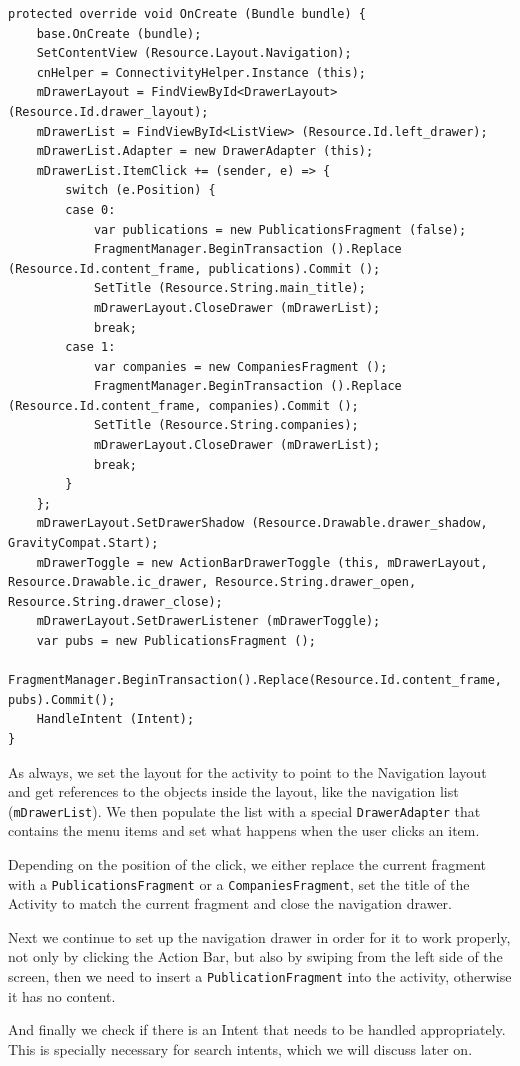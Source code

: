 \begin{lstlisting}[frame=lt,caption=MainActivity.cs, label={list:main_ac2}]
protected override void OnCreate (Bundle bundle) {
	base.OnCreate (bundle);
	SetContentView (Resource.Layout.Navigation);
	cnHelper = ConnectivityHelper.Instance (this);
	mDrawerLayout = FindViewById<DrawerLayout> (Resource.Id.drawer_layout);
	mDrawerList = FindViewById<ListView> (Resource.Id.left_drawer);
	mDrawerList.Adapter = new DrawerAdapter (this);
	mDrawerList.ItemClick += (sender, e) => {
		switch (e.Position) {
		case 0:
			var publications = new PublicationsFragment (false);
			FragmentManager.BeginTransaction ().Replace (Resource.Id.content_frame, publications).Commit ();
			SetTitle (Resource.String.main_title);
			mDrawerLayout.CloseDrawer (mDrawerList);
			break;
		case 1:
			var companies = new CompaniesFragment ();
			FragmentManager.BeginTransaction ().Replace (Resource.Id.content_frame, companies).Commit ();
			SetTitle (Resource.String.companies);
			mDrawerLayout.CloseDrawer (mDrawerList);
			break;
		} 
	};
	mDrawerLayout.SetDrawerShadow (Resource.Drawable.drawer_shadow, GravityCompat.Start);
	mDrawerToggle = new ActionBarDrawerToggle (this, mDrawerLayout, Resource.Drawable.ic_drawer, Resource.String.drawer_open, Resource.String.drawer_close);
	mDrawerLayout.SetDrawerListener (mDrawerToggle);
	var pubs = new PublicationsFragment ();
	FragmentManager.BeginTransaction().Replace(Resource.Id.content_frame, pubs).Commit();
	HandleIntent (Intent);
}
\end{lstlisting}
\vfill

As always, we set the layout for the activity to point to the Navigation layout and get references to the objects inside the layout, like the navigation list (\texttt{mDrawerList}). We then populate the list with a special \texttt{DrawerAdapter} that contains the menu items and set what happens when the user clicks an item.

Depending on the position of the click, we either replace the current fragment with a \texttt{PublicationsFragment} or a \texttt{CompaniesFragment}, set the title of the Activity to match the current fragment and close the navigation drawer.

Next we continue to set up the navigation drawer in order for it to work properly, not only by clicking the Action Bar, but also by swiping from the left side of the screen, then we need to insert a \texttt{PublicationFragment} into the activity, otherwise it has no content.

And finally we check if there is an Intent that needs to be handled appropriately. This is specially necessary for search intents, which we will discuss later on.




